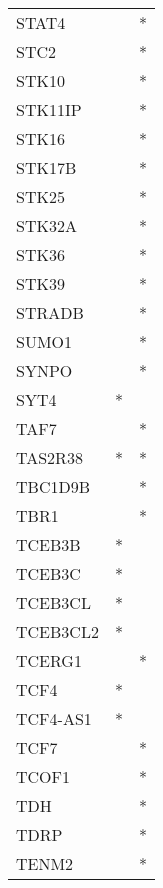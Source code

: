 \begin{longtable}{lcc}
STAT4           &                &          * \\
STC2            &                &          * \\
STK10           &                &          * \\
STK11IP         &                &          * \\
STK16           &                &          * \\
STK17B          &                &          * \\
STK25           &                &          * \\
STK32A          &                &          * \\
STK36           &                &          * \\
STK39           &                &          * \\
STRADB          &                &          * \\
SUMO1           &                &          * \\
SYNPO           &                &          * \\
SYT4            &              * &            \\
TAF7            &                &          * \\
TAS2R38         &              * &          * \\
TBC1D9B         &                &          * \\
TBR1            &                &          * \\
TCEB3B          &              * &            \\
TCEB3C          &              * &            \\
TCEB3CL         &              * &            \\
TCEB3CL2        &              * &            \\
TCERG1          &                &          * \\
TCF4            &              * &            \\
TCF4-AS1        &              * &            \\
TCF7            &                &          * \\
TCOF1           &                &          * \\
TDH             &                &          * \\
TDRP            &                &          * \\
TENM2           &                &          * \\

\end{longtable}
